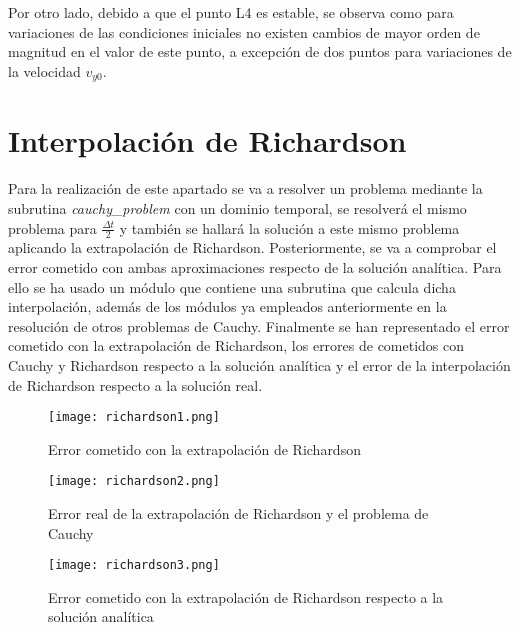 \documentclass{article}
\begin{document}
	Por otro lado, debido a que el punto L4 es estable, se observa como para variaciones de las condiciones iniciales no existen cambios de mayor orden de magnitud en el valor de este punto, a excepción de dos puntos para variaciones de la velocidad $v_{y0}$.
	
	\newpage
	
	\section{Interpolación de Richardson}
	
	Para la realización de este apartado se va a resolver un problema mediante la subrutina \textit{cauchy\_problem} con un dominio temporal, se resolverá el mismo problema para $\frac{\Delta t}{2}$ y también se hallará la solución a este mismo problema aplicando la extrapolación de Richardson. Posteriormente, se va a comprobar el error cometido con ambas aproximaciones respecto de la solución analítica. Para ello se ha usado un módulo que contiene una subrutina que calcula dicha interpolación, además de los módulos ya empleados anteriormente en la resolución de otros problemas de Cauchy. Finalmente se han representado el error cometido con la extrapolación de Richardson, los errores de cometidos con Cauchy y Richardson respecto a la solución analítica y el error de la interpolación de Richardson respecto a la solución real.
	
	\begin{figure}[h!]
		\begin{center}
			\texttt{[image: richardson1.png]}
			\caption{Error cometido con la extrapolación de Richardson}
		\end{center}
	\end{figure}

	\begin{figure}[h!]
		\begin{center}
			\texttt{[image: richardson2.png]}
			\caption{Error real de la extrapolación de Richardson y el problema de Cauchy}
		\end{center}
	\end{figure}

	\newpage

	\begin{figure}[h!]
		\begin{center}
			\texttt{[image: richardson3.png]}
			\caption{Error cometido con la extrapolación de Richardson respecto a la solución analítica}
		\end{center}
	\end{figure}
	
\end{document}
